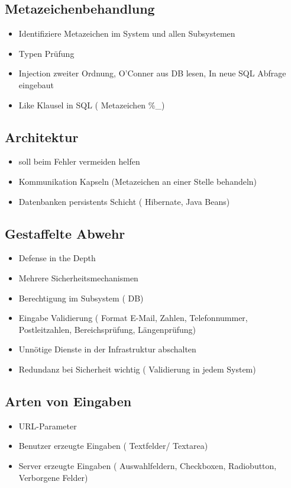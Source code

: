 \subsection*{ Metazeichenbehandlung }
\begin{itemize}
	\item Identifiziere Metazeichen im System und allen Subsystemen
	\item Typen Prüfung
	\item Injection zweiter Ordnung, O'Conner aus DB lesen, In neue SQL Abfrage eingebaut
	\item Like Klausel in SQL ( Metazeichen \%\_)
\end{itemize}

\subsection*{ Architektur }
\begin{itemize}
	\item soll beim Fehler vermeiden helfen
	\item Kommunikation Kapseln (Metazeichen an einer Stelle behandeln)
	\item Datenbanken persistents Schicht ( Hibernate, Java Beans)
\end{itemize}

\subsection*{ Gestaffelte Abwehr }
\begin{itemize}
	\item Defense in the Depth
	\item Mehrere Sicherheitsmechanismen
	\item Berechtigung im Subsystem ( DB)
	\item Eingabe Validierung ( Format E-Mail, Zahlen, Telefonnummer, Postleitzahlen, Bereichsprüfung, Längenprüfung)
	\item Unnötige Dienste in der Infrastruktur abschalten
	\item Redundanz bei Sicherheit wichtig ( Validierung in jedem System)
\end{itemize}

\subsection*{ Arten von Eingaben }
\begin{itemize}
	\item URL-Parameter
	\item Benutzer erzeugte Eingaben ( Textfelder/ Textarea)
	\item Server erzeugte Eingaben ( Auswahlfeldern, Checkboxen,  Radiobutton, Verborgene Felder)
\end{itemize}

